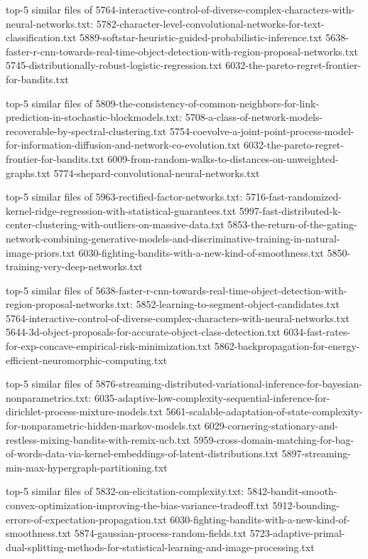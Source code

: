 \documentclass[11pt]{article}
\begin{document}
top-5 similar files of
5764-interactive-control-of-diverse-complex-characters-with-neural-networks.txt:
5782-character-level-convolutional-networks-for-text-classification.txt
5889-softstar-heuristic-guided-probabilistic-inference.txt
5638-faster-r-cnn-towards-real-time-object-detection-with-region-proposal-networks.txt
5745-distributionally-robust-logistic-regression.txt
6032-the-pareto-regret-frontier-for-bandits.txt

top-5 similar files of
5809-the-consistency-of-common-neighbors-for-link-prediction-in-stochastic-blockmodels.txt:
5708-a-class-of-network-models-recoverable-by-spectral-clustering.txt
5754-coevolve-a-joint-point-process-model-for-information-diffusion-and-network-co-evolution.txt
6032-the-pareto-regret-frontier-for-bandits.txt
6009-from-random-walks-to-distances-on-unweighted-graphs.txt
5774-shepard-convolutional-neural-networks.txt

top-5 similar files of 5963-rectified-factor-networks.txt:
5716-fast-randomized-kernel-ridge-regression-with-statistical-guarantees.txt
5997-fast-distributed-k-center-clustering-with-outliers-on-massive-data.txt
5853-the-return-of-the-gating-network-combining-generative-models-and-discriminative-training-in-natural-image-priors.txt
6030-fighting-bandits-with-a-new-kind-of-smoothness.txt
5850-training-very-deep-networks.txt

top-5 similar files of
5638-faster-r-cnn-towards-real-time-object-detection-with-region-proposal-networks.txt:
5852-learning-to-segment-object-candidates.txt
5764-interactive-control-of-diverse-complex-characters-with-neural-networks.txt
5644-3d-object-proposals-for-accurate-object-class-detection.txt
6034-fast-rates-for-exp-concave-empirical-risk-minimization.txt
5862-backpropagation-for-energy-efficient-neuromorphic-computing.txt

top-5 similar files of
5876-streaming-distributed-variational-inference-for-bayesian-nonparametrics.txt:
6035-adaptive-low-complexity-sequential-inference-for-dirichlet-process-mixture-models.txt
5661-scalable-adaptation-of-state-complexity-for-nonparametric-hidden-markov-models.txt
6029-cornering-stationary-and-restless-mixing-bandits-with-remix-ucb.txt
5959-cross-domain-matching-for-bag-of-words-data-via-kernel-embeddings-of-latent-distributions.txt
5897-streaming-min-max-hypergraph-partitioning.txt

top-5 similar files of 5832-on-elicitation-complexity.txt:
5842-bandit-smooth-convex-optimization-improving-the-bias-variance-tradeoff.txt
5912-bounding-errors-of-expectation-propagation.txt
6030-fighting-bandits-with-a-new-kind-of-smoothness.txt
5874-gaussian-process-random-fields.txt
5723-adaptive-primal-dual-splitting-methods-for-statistical-learning-and-image-processing.txt
\end{document}

